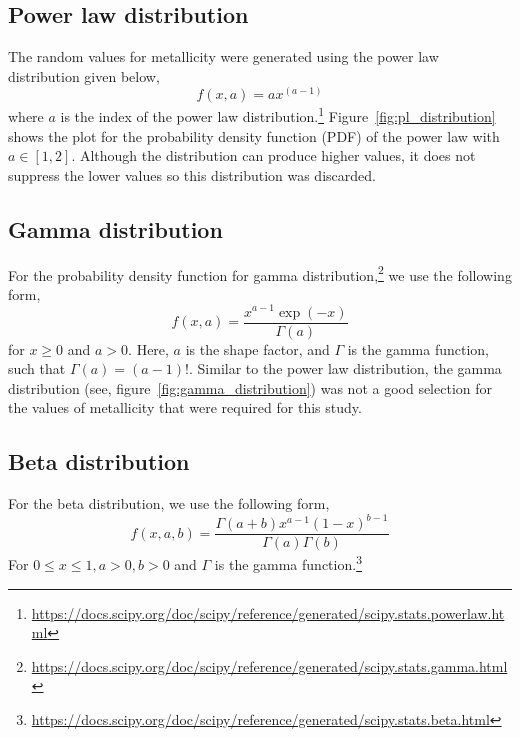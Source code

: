 \subsection{Power law distribution}
\label{subsec:power-law-distribution}
The random values for metallicity were generated using the power law distribution given below,
\begin{equation}
    f(x, a) = ax^{(a-1)}
    \label{eq:powerlaw_distribution}
\end{equation}
where $a$ is the index of the power law distribution.\footnote{\url{https://docs.scipy.org/doc/scipy/reference/generated/scipy.stats.powerlaw.html}}
Figure~\ref{fig:pl_distribution} shows the plot for the probability density function (PDF) of the power law with $a \in [1, 2]$.
Although the distribution can produce higher values, it does not suppress the lower values so this distribution was discarded.

\subsection{Gamma distribution}
\label{subsec:gamma-distribution}
For the probability density function for gamma distribution,\footnote{\url{https://docs.scipy.org/doc/scipy/reference/generated/scipy.stats.gamma.html}} we use the following form,
\begin{equation}
    f(x, a) = \frac{x^{a-1}\exp(-x)}{\Gamma(a)}
    \label{eq:gamma_distribution}
\end{equation}
for $x\geq 0$ and $a > 0$.
Here, $a$ is the shape factor, and $\Gamma$ is the gamma function, such that $\Gamma(a) = (a-1)!$.
Similar to the power law distribution, the gamma distribution (see, figure~\ref{fig:gamma_distribution}) was not a good selection for the values of metallicity that were required for this study.

\subsection{Beta distribution}
\label{subsec:beta-distribution}

For the beta distribution, we use the following form,
\begin{equation}
    f(x, a, b) = \frac{\Gamma(a+b)x^{a-1}(1-x)^{b-1}}{\Gamma(a)\Gamma(b)}
    \label{eq:beta_distribution}
\end{equation}
For $0 \leq x \leq 1, a > 0, b > 0$ and $\Gamma$ is the gamma function.\footnote{\url{https://docs.scipy.org/doc/scipy/reference/generated/scipy.stats.beta.html}}

